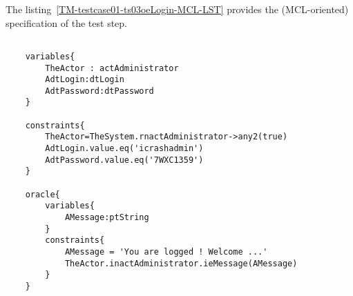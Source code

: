 		
	\vspace{1cm}
	The listing~\ref{TM-testcase01-ts03oeLogin-MCL-LST} provides the \msrmessir (MCL-oriented) specification of the test step.
	
	\scriptsize
	\vspace{0.5cm}
	\begin{lstlisting}[style=MessirStyle,firstnumber=auto,captionpos=b,caption={\msrmessir (MCL-oriented) specification of the test step \emph{testcase01-ts03oeLogin}.},label=TM-testcase01-ts03oeLogin-MCL-LST]

	variables{
		TheActor : actAdministrator
		AdtLogin:dtLogin
		AdtPassword:dtPassword
	}
	
	constraints{
		TheActor=TheSystem.rnactAdministrator->any2(true)
		AdtLogin.value.eq('icrashadmin')
		AdtPassword.value.eq('7WXC1359')
	}
	
	oracle{
		variables{
			AMessage:ptString
		}
		constraints{
			AMessage = 'You are logged ! Welcome ...'
			TheActor.inactAdministrator.ieMessage(AMessage)
		}
	}
	
	\end{lstlisting}
	\normalsize 
	
	

